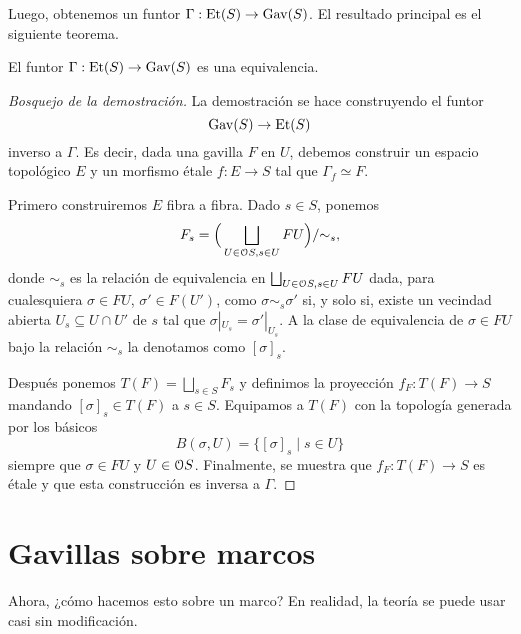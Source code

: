 Luego, obtenemos un funtor $\Gamma:\Et(S)\to\Gav(S)$.
El resultado principal es el siguiente teorema.

\begin{theorem}
    El funtor $\Gamma:\Et(S)\to\Gav(S)$ es una equivalencia.
\end{theorem}
\begin{proof}[Bosquejo de la demostración]
    La demostración se hace construyendo el funtor
    \[\Gav(S)\to\Et(S)\] inverso a $\Gamma$.
    Es decir, dada una gavilla $F$ en $U$,
    debemos construir un espacio topológico $E$ y un morfismo
    étale $f:E\to S$ tal que $\Gamma_f\simeq F$.
    
    Primero construiremos $E$ fibra a fibra.
    Dado $s\in S$, ponemos
    \[
        F_s = \Big(\bigsqcup_{U\in\cal OS,s\in U} FU\Big)/\simr_s
    ,\]
    donde $\sim_s$ es la relación de equivalencia en
    $\bigsqcup_{U\in\cal OS,s\in U}FU$ dada,
    para cualesquiera $\sigma\in FU$, $\sigma'\in F(U')$, como
    $\sigma\sim_s\sigma'$ si, y solo si, existe un vecindad abierta
    $U_s\subseteq U\cap U'$ de $s$
    tal que $\sigma|_{U_s}=\sigma'|_{U_s}$.
    A la clase de equivalencia de $\sigma\in FU$ bajo la relación
    $\sim_s$ la denotamos como $[\sigma]_s$.
    
    Después ponemos $T(F)=\bigsqcup_{s\in S}F_s$
    y definimos la proyección $f_F:T(F)\to S$
    mandando $[\sigma]_s\in T(F)$ a $s\in S$.
    Equipamos a $T(F)$ con la topología generada por los básicos
    \[
        B(\sigma,U) = \{[\sigma]_s\mid s\in U\}
    \]
    siempre que $\sigma\in FU$ y $U\in\cal OS$.
    Finalmente, se muestra que $f_F:T(F)\to S$ es étale
    y que esta construcción es inversa a $\Gamma$.
\end{proof}

\section{Gavillas sobre marcos}
Ahora, ¿cómo hacemos esto sobre un marco?
En realidad, la teoría se puede usar casi sin modificación.

